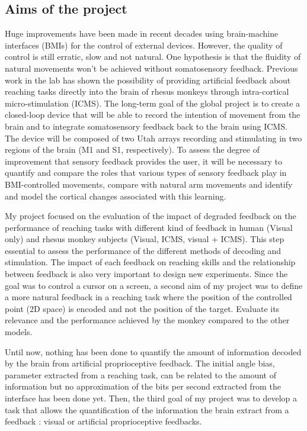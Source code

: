 \documentclass[preprint,12pt]{elsarticle}
\begin{document}
\subsection{Aims of the project}
Huge improvements have been made in recent decades using brain-machine interfaces (BMIs) for the control of external devices. However, the quality of control is still erratic, slow and not natural. One hypothesis is that the fluidity of natural movements won't be achieved without somatosensory feedback. Previous work in the lab has shown the possibility of providing artificial feedback about reaching tasks directly into the brain of rhesus monkeys through intra-cortical micro-stimulation (ICMS). The long-term goal of the global project is to create a closed-loop device that will be able to record the intention of movement from the brain and to integrate somatosensory feedback back to the brain using ICMS. The device will be composed of two Utah arrays recording and stimulating in two regions of the brain (M1 and S1, respectively). To assess the degree of improvement that sensory feedback provides the user, it will be necessary to quantify and compare the roles that various types of sensory feedback play in BMI-controlled movements, compare with natural arm movements and identify and model the cortical changes associated with this learning.

My project focused on the evaluation of the impact of degraded feedback on the performance of reaching tasks with different kind of feedback in human (Visual only) and rhesus monkey subjects (Visual, ICMS, visual + ICMS). This step essential to assess the performance of the different methods of decoding and stimulation. The impact of each feedback on reaching skills and the relationship between feedback is also very important to design new experiments. Since the goal was to control a cursor on a screen, a second aim of my project was to define a more natural feedback in a reaching task where the position of the controlled point (2D space) is encoded and not the position of the target. Evaluate its relevance and the performance achieved by the monkey compared to the other models.

Until now, nothing has been done to quantify the amount of information decoded by the brain from artificial proprioceptive feedback. The initial angle bias, parameter extracted from a reaching task, can be related to the amount of information but no approximation of the bits per second extracted from the interface has been done yet. Then, the third goal of my project was to develop a task that allows the quantification of the information the brain extract from a feedback : visual or artificial proprioceptive feedbacks.
\end{document}
